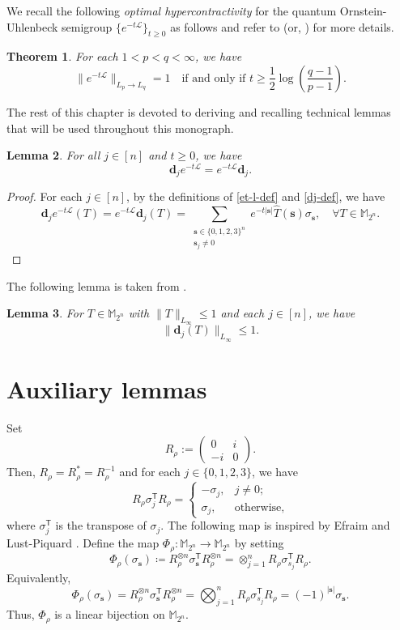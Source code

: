 \documentclass{amsbook}
\newtheorem{theorem}{Theorem}[chapter]
\newtheorem{lemma}[theorem]{Lemma}
\theoremstyle{definition}
\theoremstyle{remark}
\numberwithin{section}{chapter}
\numberwithin{equation}{chapter}
\newcommand{\1}{\mathbf{1}}
\newcommand{\s}{\mathbf{s}}
\newcommand{\dc}{\mathbf{d}}
\begin{document}
We recall the following \emph{optimal hypercontractivity} for the quantum Ornstein-Uhlenbeck semigroup $\{e^{-t\mathcal{L}}\}_{t\geq 0}$ as follows and  refer to \cite{K2014} (or, \cite[Theorem 8.4]{MO2010}) for more details.
\begin{theorem}\label{hc-1}
For each $1 < p < q < \infty$, we have
\[
\| e^{-t\mathcal{L}} \|_{L_p \to L_q} = 1 \quad \mbox{if and only if } t \geq \frac{1}{2} \log ( \frac{q-1}{p-1} ).
\]
\end{theorem}
The rest of this chapter is devoted to deriving and recalling technical lemmas that will be used throughout this monograph.

\begin{lemma}\label{intertwining}
For all $j\in[n]$ and $t\geq0$, we have
$$\dc_je^{-t\mathcal{L}}=e^{-t\mathcal{L}}\dc_j.$$
\end{lemma}
\begin{proof} For each $j\in[n]$, by the definitions of   \eqref{et-l-def} and \eqref{dj-def}, we have
$$\dc_je^{-t\mathcal{L}}(T)=e^{-t\mathcal{L}}\dc_j(T)=\sum_{\substack{\mathbf{s}\in\{0,1,2,3\}^n\\\s_j \neq 0}}e^{-t|\mathbf{s}|}\widehat{T}(\mathbf{s})\sigma_\mathbf{s},\quad \forall T\in\mathbb{M}_{2^n}.$$
\end{proof}

The following lemma is taken from \cite[Proposition 2.7 (i)]{JLLZ2025}.
\begin{lemma}\label{jlzz-lem}
For $T\in\mathbb{M}_{2^n}$ with $\|T\|_{L_\infty}\leq1$ and each $j\in[n]$, we have
\[
\|\dc_{j}(T)\|_{L_\infty}\leq1.
\]
\end{lemma}
\section{Auxiliary lemmas}
Set
\[
R_\rho:=\begin{pmatrix} 0 & i \\ -i & 0 \end{pmatrix}.
\]
Then,   $R_{\rho}=R^{*}_{\rho}=R^{-1}_{\rho}$ and for each $j \in \{0,1,2,3\}$, we have
\[
R_\rho\sigma_j^{\mathsf T}R_\rho = 
\begin{cases} 
-\sigma_j, & j \neq 0; \\ 
\sigma_j, & \text{otherwise,} 
\end{cases}
\]
where $\sigma_j^{\mathsf T}$ is the transpose of $\sigma_j$. The following map is inspired by Efraim and Lust-Piquard \cite{ELP2008}. Define the  map $\varPhi_\rho:\mathbb{M}_{2^n} \rightarrow \mathbb{M}_{2^n}$ by setting
\begin{equation}\label{var-def}
\varPhi_\rho(\sigma_{\mathbf{s}})\coloneqq R_\rho^{\otimes n}\sigma_{\mathbf{s}}^{\mathsf T}R_\rho^{\otimes n}=\otimes_{j=1}^nR_\rho\sigma_{s_j}^{\mathsf T}R_\rho.
\end{equation}
Equivalently,
\begin{equation}\label{var-def-2}
 \varPhi_\rho(\sigma_{\s})=R_\rho^{\otimes n}\sigma_{\s}^{\mathsf T}R_\rho^{\otimes n}
 =\bigotimes_{j=1}^n R_\rho\sigma_{s_j}^{\mathsf T}R_\rho
 =(-1)^{|\s|}\sigma_{\s}.
\end{equation}
Thus, $\varPhi_{\rho}$ is a linear bijection on $\mathbb{M}_{2^n}$.
\end{document}
